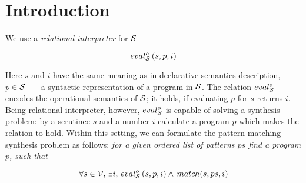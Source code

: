 \section{Introduction}

\begin{comment}
Algebraic data types are essential for typed functional programming and it's difficult to imagine effective compiler without effective compilation of pattern matching. 
There are a few different approaches for compiling pattern mathcing. GHC is using influential paper~\cite{Jones1987}, OCaml is currently based on~\cite{maranget2001} although a work~\cite{maranget2008} can slightly improve effectiveness of generated code. 

Also there are a number of possible extensions of pattern matching itself (guards, non-linear patterns, active patterns) and extensions of possible matchable values (polymorphic variants in OCaml, for example). Although having all these extensions can be helpful for programming in practice, they can complicate compilation schema or make it very difficult to generate effective code. Supporting a large number  of extensions can seriously complicate compiler's implementation too.

We present an approach to pattern matching code generation based on application of relational programming~\cite{TRS,WillThesis} and, in
 particular, relational interpreters~\cite{unified}. We expect that our approach can compile pattern mathcing to competitive code and will be easier to support during adding of new pattern matching extensions.
 
\end{comment}
 We use a \emph{relational interpreter} for $\mathcal{S}$
 
 \[
 eval^o_{\mathcal{S}}\, (s, p, i)
 \]
 
 Here $s$ and $i$ have the same meaning as in declarative semantics description, $p\in\mathcal{S}$~--- a syntactic representation of
 a program in $\mathcal{S}$. The relation $eval^o_{\mathcal{S}}$ encodes the operational semantics of $\mathcal{S}$; it holds, if
 evaluating $p$ for $s$ returns $i$. Being relational interpreter, however, $eval^o_{\mathcal{S}}$ is capable of solving a
 synthesis problem: by a scrutinee $s$ and a number $i$ calculate a program $p$ which makes the relation to hold.
 Within this setting, we can formulate the pattern-matching synthesis problem as follows: \emph{for a given ordered list of patterns $ps$ find a program $p$, such that}
 
 \[
 \forall s\in\mathcal{V},\,\exists i,\,eval^o_{\mathcal{S}}\, (s, p, i) \wedge\, match (s, ps, i)
 \]
 
